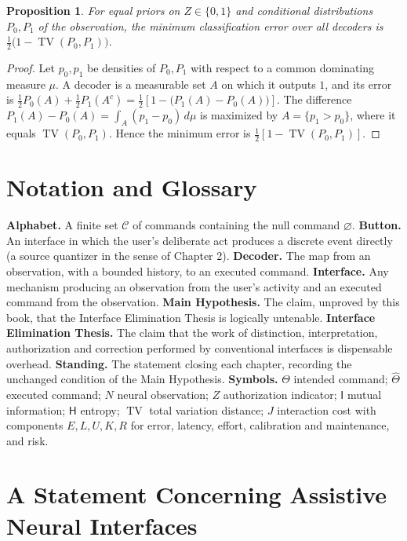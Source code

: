 \documentclass[11pt,twoside,openany]{book}
\newtheorem{proposition}[theorem]{Proposition}
\theoremstyle{definition}
\theoremstyle{remark}
\newcommand{\C}{\mathcal{C}}
\newcommand{\MI}{\mathsf{I}}
\newcommand{\Hent}{\mathsf{H}}
\newcommand{\Th}{\Theta}
\newcommand{\Thh}{\widehat{\Theta}}
\DeclareMathOperator{\TV}{TV}
\begin{document}
\begin{proposition}
For equal priors on $Z\in\{0,1\}$ and conditional distributions $P_0,P_1$ of the observation, the minimum classification error over all decoders is $\tfrac12\bigl(1-\TV(P_0,P_1)\bigr)$.
\end{proposition}
\begin{proof}
Let $p_0,p_1$ be densities of $P_0,P_1$ with respect to a common dominating measure $\mu$. A decoder is a measurable set $A$ on which it outputs $1$, and its error is $\tfrac12P_0(A)+\tfrac12P_1(A^{c})=\tfrac12\left[1-\bigl(P_1(A)-P_0(A)\bigr)\right]$. The difference $P_1(A)-P_0(A)=\int_A(p_1-p_0)\,d\mu$ is maximized by $A=\{p_1>p_0\}$, where it equals $\TV(P_0,P_1)$. Hence the minimum error is $\tfrac12\left[1-\TV(P_0,P_1)\right]$.
\end{proof}

\chapter{Notation and Glossary}

\noindent\textbf{Alphabet.} A finite set $\C$ of commands containing the null command $\varnothing$. \textbf{Button.} An interface in which the user's deliberate act produces a discrete event directly (a source quantizer in the sense of Chapter 2). \textbf{Decoder.} The map from an observation, with a bounded history, to an executed command. \textbf{Interface.} Any mechanism producing an observation from the user's activity and an executed command from the observation. \textbf{Main Hypothesis.} The claim, unproved by this book, that the Interface Elimination Thesis is logically untenable. \textbf{Interface Elimination Thesis.} The claim that the work of distinction, interpretation, authorization and correction performed by conventional interfaces is dispensable overhead. \textbf{Standing.} The statement closing each chapter, recording the unchanged condition of the Main Hypothesis. \textbf{Symbols.} $\Th$ intended command; $\Thh$ executed command; $N$ neural observation; $Z$ authorization indicator; $\MI$ mutual information; $\Hent$ entropy; $\TV$ total variation distance; $J$ interaction cost with components $E,L,U,K,R$ for error, latency, effort, calibration and maintenance, and risk.

\chapter{A Statement Concerning Assistive Neural Interfaces}
\end{document}
